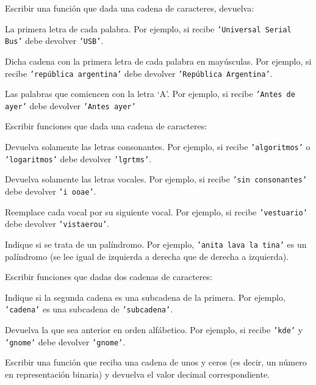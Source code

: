\begin{ejercicio}
Escribir una función que dada una cadena de caracteres, devuelva:
\begin{partes}
\item La primera letra de cada palabra. Por ejemplo, si recibe
\texttt{'Universal Serial Bus'} debe devolver \texttt{'USB'}.
\item Dicha cadena con la primera letra de cada palabra en mayúsculas. Por
ejemplo, si recibe \texttt{'república argentina'} debe devolver
\texttt{'República Argentina'}.
\item Las palabras que comiencen con la letra `A'. Por ejemplo, si recibe
\texttt{'Antes de ayer'} debe devolver \texttt{'Antes ayer'}
\end{partes}
\end{ejercicio}


\begin{ejercicio}
Escribir funciones que dada una cadena de caracteres:
\begin{partes}
\item Devuelva solamente las letras consonantes. Por ejemplo, si recibe
\texttt{'algoritmos'} o \texttt{'logaritmos'} debe devolver \texttt{'lgrtms'}.
\item Devuelva solamente las letras vocales. Por ejemplo, si recibe \texttt{'sin
consonantes'} debe devolver \texttt{'i ooae'}.
\item Reemplace cada vocal por su siguiente vocal. Por ejemplo, si recibe
\texttt{'vestuario'} debe devolver \texttt{'vistaerou'}.
\item Indique si se trata de un palíndromo. Por ejemplo, \texttt{'anita
lava la tina'} es un palíndromo (se lee igual de izquierda a derecha que de
derecha a izquierda).
\end{partes}
\end{ejercicio}


\begin{ejercicio}
Escribir funciones que dadas dos cadenas de caracteres:
\begin{partes}
\item Indique si la segunda cadena es una subcadena de la primera. Por ejemplo,
\texttt{'cadena'} es una subcadena de \texttt{'subcadena'}.
\item Devuelva la que sea anterior en orden alfábetico. Por ejemplo, si recibe
\texttt{'kde'} y \texttt{'gnome'} debe devolver \texttt{'gnome'}.
\end{partes}
\end{ejercicio}


\begin{ejercicio}
Escribir una función que reciba una cadena de unos y ceros (es decir, un
número en representación binaria) y devuelva el valor decimal
correspondiente.
\end{ejercicio}

